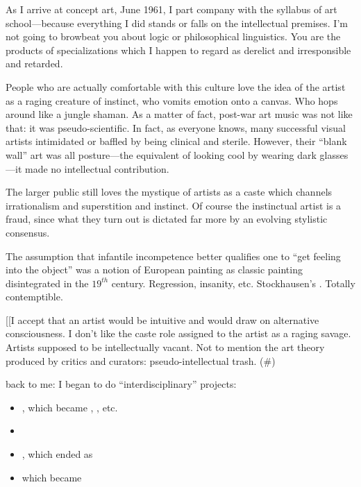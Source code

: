 \Pb

As I arrive at concept art, June 1961, I part company with the syllabus of art school---because everything I did stands or falls on the intellectual premises.  I'm not going to browbeat you about logic or philosophical linguistics.  You are the products of specializations which I happen to regard as derelict and irresponsible and retarded.

\Pb

People who are actually comfortable with this culture love the idea of the artist as a raging creature of instinct, who vomits emotion onto a canvas.  Who hops around like a jungle shaman.  As a matter of fact, post-war art music was not like that:  it was pseudo-scientific.  In fact, as everyone knows, many successful visual artists intimidated or baffled by being clinical and sterile.  However, their \enquote{blank wall} art was all posture---the equivalent of looking cool by wearing dark glasses---it made no intellectual contribution. 

The larger public still loves the mystique of artists as a caste which channels irrationalism and superstition and instinct.  Of course the instinctual artist is a fraud, since what they turn out is dictated far more by an evolving stylistic consensus. 

The assumption that infantile incompetence better qualifies one to \enquote{get feeling into the object} was a notion of European painting as classic painting disintegrated in the $19^{th}$ century.  Regression, insanity, etc.  Stockhausen's .  Totally contemptible.

[[I accept that an artist would be intuitive and would draw on alternative consciousness.  I don't like the caste role assigned to the artist as a raging savage.  Artists supposed to be intellectually vacant.  Not to mention the art theory produced by critics and curators:  pseudo-intellectual trash. (\#)

\Pb

back to me:  I began to do \enquote{interdisciplinary} projects: \\
\begin{itemize}
\item {}, which became , , etc.
\item {} 
\item {}, which ended as 
\item {} which became  
\end{itemize}

